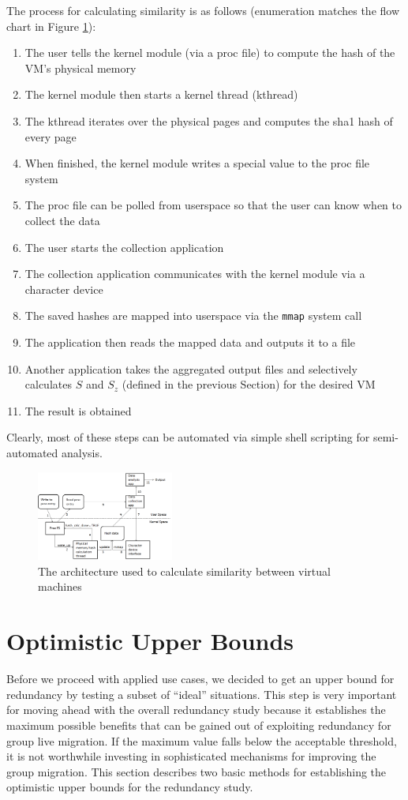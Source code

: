 \documentclass{acm_proc_article-sp}
\begin{document}
The process for calculating similarity is as follows (enumeration matches the flow chart in Figure \ref{fig:flow}):
\begin{enumerate}
  \item The user tells the kernel module (via a proc file)  to compute the hash of the VM's physical memory
  \item The kernel module then starts a kernel thread (kthread)
  \item The kthread iterates over the physical pages and computes the sha1 hash of every page
  \item When finished, the kernel module writes a special value to the proc file system
  \item The proc file can be polled from userspace so that the user can know when to collect the data
  \item The user starts the collection application
  \item The collection application communicates with the kernel module via a character device
  \item The saved hashes are mapped into userspace via the {\tt mmap} system call
  \item The application then reads the mapped data and outputs it to a file
  \item Another application takes the aggregated output files and selectively calculates $S$ and $S_z$ (defined in the previous Section) for the desired VM
  \item The result is obtained
\end{enumerate}
Clearly, most of these steps can be automated via simple shell scripting for semi-automated analysis.

\begin{figure}
  \centering
  \includegraphics[width=0.4\textwidth]{images/architecture.png}
  \caption{The architecture used to calculate similarity between virtual machines}\label{fig:flow}
\end{figure}

\section{Optimistic Upper Bounds}\label{sec:optimistic}
Before we proceed with applied use cases, we decided to get an upper bound for redundancy by testing a subset of ``ideal'' situations. This step is very important for moving ahead with the overall redundancy study because it establishes the maximum possible benefits that can be gained out of exploiting redundancy for group live migration. If the maximum value falls below the acceptable threshold, it is not worthwhile investing in sophisticated mechanisms for improving the group migration. This section describes two basic methods for establishing the optimistic upper bounds for the redundancy study.
\end{document}
